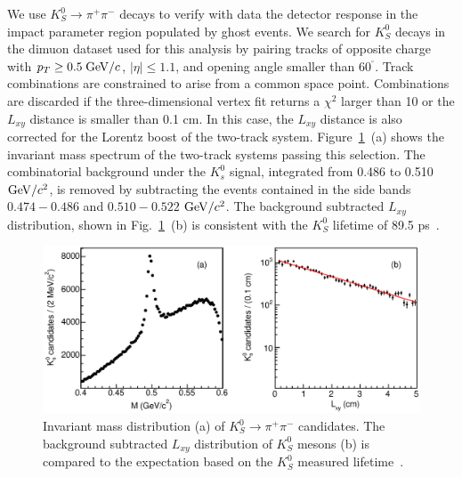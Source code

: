 \documentclass[aps,prd,preprint,floatfix,nofootinbib,superscriptaddress,showpacs,amssymb]{revtex4}
\def\deg{^\circ}
\begin{document}
 We use $K_S^0 \rightarrow \pi^+ \pi^- $ decays to verify with data the 
 detector response in the impact parameter region populated by ghost events.
 We search for $K_S^0$ decays in the dimuon dataset used for this analysis
 by pairing tracks of opposite charge with $p_T \geq 0.5 \; {\rm GeV/}c$,
 $|\eta| \leq 1.1$, and opening angle smaller than 60$^{\deg}$. Track
 combinations are constrained to arise from a common space point.
 Combinations are discarded if the three-dimensional vertex fit returns
 a $\chi^2$ larger than 10 or the  $L_{xy}$ distance is smaller than 0.1 cm.
 In this case, the $L_{xy}$ distance is also corrected for the Lorentz
 boost of the two-track system. Figure~\ref{fig:fig_k0s}~(a) shows the
 invariant mass spectrum of the two-track systems passing this selection.
 The combinatorial background under the $K_s^0$ signal, integrated from
 0.486 to 0.510 ${\rm GeV/}c^2$, is removed by subtracting the events contained
 in the side bands $0.474-0.486$ and $0.510-0.522$ ${\rm GeV/}c^2$. The
 background subtracted $L_{xy}$ distribution, shown in
 Fig.~\ref{fig:fig_k0s}~(b) is consistent with the $K_S^0$ lifetime
 of 89.5 ps~\cite{pdg}.
 \begin{figure}
 \begin{center}
 \vspace{-0.3in}
 \leavevmode
 \includegraphics*[width=\textwidth]{k0sfig_new.eps}
 \caption[]{Invariant mass distribution (a) of $K_S^0 \rightarrow \pi^+ \pi^-$
            candidates. The background subtracted $L_{xy}$ distribution of
            $K_S^0$ mesons (b) is compared to the expectation based on the
            $K_S^0$ measured lifetime~\cite{pdg}.}
 \label{fig:fig_k0s}
 \end{center}
 \end{figure}
\end{document}
